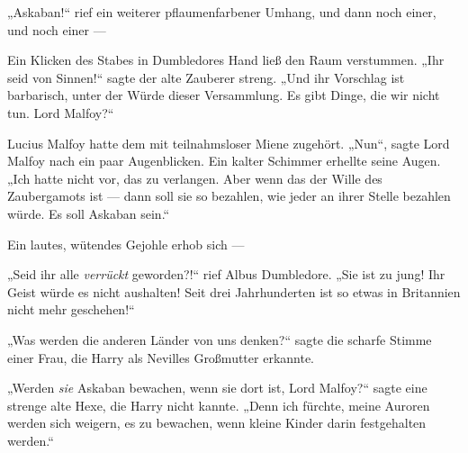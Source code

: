 „Askaban!“ rief ein weiterer pflaumenfarbener Umhang, und dann noch einer, und noch einer —

Ein Klicken des Stabes in Dumbledores Hand ließ den Raum verstummen.
„Ihr seid von Sinnen!“ sagte der alte Zauberer streng.
„Und ihr Vorschlag ist barbarisch, unter der Würde dieser Versammlung. Es gibt Dinge, die wir nicht tun. Lord Malfoy?“

Lucius Malfoy hatte dem mit teilnahmsloser Miene zugehört.
„Nun“, sagte Lord Malfoy nach ein paar Augenblicken. Ein kalter Schimmer erhellte seine Augen.
„Ich hatte nicht vor, das zu verlangen. Aber wenn das der Wille des Zaubergamots ist — dann soll sie so bezahlen, wie jeder an ihrer Stelle bezahlen würde. Es soll Askaban sein.“

Ein lautes, wütendes Gejohle erhob sich —

„Seid ihr alle \emph{verrückt} geworden?!“ rief Albus Dumbledore.
„Sie ist zu jung! Ihr Geist würde es nicht aushalten! Seit drei Jahrhunderten ist so etwas in Britannien nicht mehr geschehen!“

„Was werden die anderen Länder von uns denken?“ sagte die scharfe Stimme einer Frau, die Harry als Nevilles Großmutter erkannte.

„Werden \emph{sie} Askaban bewachen, wenn sie dort ist, Lord Malfoy?“ sagte eine strenge alte Hexe, die Harry nicht kannte.
„Denn ich fürchte, meine Auroren werden sich weigern, es zu bewachen, wenn kleine Kinder darin festgehalten werden.“

